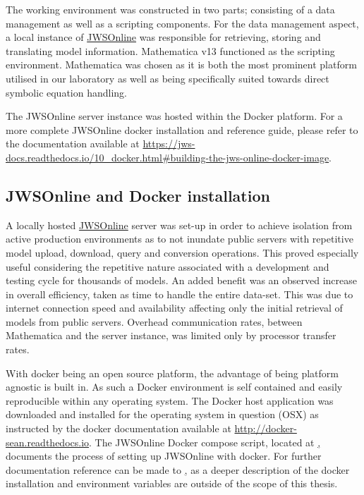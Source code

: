 The working environment was constructed in two parts; consisting of a data management as well as a scripting components. For the data management aspect, a local instance of \href{https://jjj.bio.vu.nl}{JWSOnline} was responsible for retrieving, storing and translating model information. Mathematica v13 functioned as the scripting environment. Mathematica was chosen as it is both the most prominent platform utilised in our laboratory as well as being specifically suited towards direct symbolic equation handling. 

The JWSOnline server instance was hosted within the Docker platform. For a more complete JWSOnline docker installation and reference guide, please refer to the documentation available at \href{https://jws-docs.readthedocs.io/10_docker.html#building-the-jws-online-docker-image}{https://jws-docs.readthedocs.io/10_docker.html#building-the-jws-online-docker-image}. 

\subsection{JWSOnline and Docker installation} \label{Docker Installation}
A locally hosted \href{https://jjj.bio.vu.nl}{JWSOnline} server was set-up in order to achieve isolation from active production environments as to not inundate public servers with repetitive model upload, download, query and conversion operations. This proved especially useful considering the repetitive nature associated with a development and testing cycle for thousands of models. An added benefit was an observed increase in overall efficiency, taken as time to handle the entire data-set. This was due to internet connection speed and availability affecting only the initial retrieval of models from public servers. Overhead communication rates, between Mathematica and the server instance, was limited only by processor transfer rates. 

With docker being an open source platform, the advantage of being platform agnostic is built in. As such a Docker environment is self contained and easily reproducible within any operating system. The Docker host application was downloaded and installed for the operating system in question (OSX) as instructed by the docker documentation available at \href{http://docker-sean.readthedocs.io}{http://docker-sean.readthedocs.io}. The JWSOnline Docker compose script, located at \href{http://jws-docs.readthedocs.io/10_docker.html#building-the-jws-online-docker-image}, documents the process of setting up JWSOnline with docker. For further documentation reference can be made to \href{https://docs.docker.com/compose/compose-file/#compose-file-structure-and-examples}, as a deeper description of the docker installation and environment variables are outside of the scope of this thesis.

